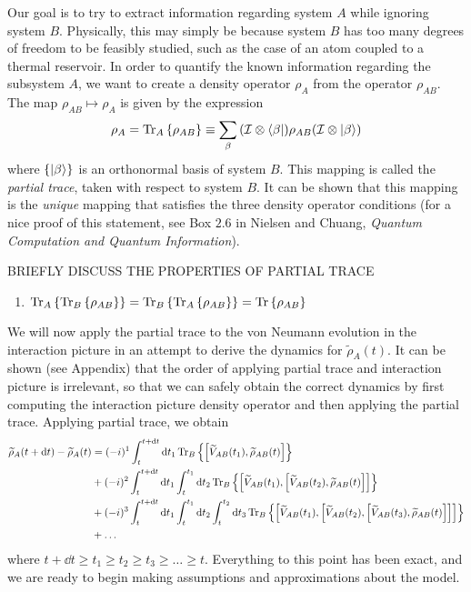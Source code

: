 \documentclass[aps, prl, preprint]{revtex4-1}
\newcommand{\ten}{\otimes}
\newcommand{\Tra}[1]{\Tr\left\{#1\right\}}
\newcommand{\Ptra}[2]{\Tr_{#1}\left\{#2\right\}}
\newcommand{\til}[1]{\widetilde{#1}}
\newcommand{\I}{\mathcal{I}}
\begin{document}
Our goal is to try to extract information regarding system $A$ while ignoring system $B$. Physically, this may simply be because system $B$ has too many degrees of freedom to be feasibly studied, such as the case of an atom coupled to a thermal reservoir. In order to quantify the known information regarding the subsystem $A$, we want to create a density operator $\rho_A$ from the operator $\rho_{AB}$. The map $\rho_{AB}\mapsto\rho_A$ is given by the expression
\begin{equation}\label{ptra}
\rho_A = \Ptra{A}{\rho_{AB}}\equiv\sum_{\beta}\qty(\I\ten\bra{\beta})\rho_{AB}\qty(\I\ten\ket{\beta})
\end{equation}
where $\{\ket{\beta}\}$ is an orthonormal basis of system $B$. This mapping is called the \textit{partial trace}, taken with respect to system $B$. It can be shown that this mapping is the \textit{unique} mapping that satisfies the three density operator conditions (for a nice proof of this statement, see Box $2.6$ in Nielsen and Chuang, \textit{Quantum Computation and Quantum Information}).

BRIEFLY DISCUSS THE PROPERTIES OF PARTIAL TRACE
\begin{enumerate}
	\item $\Ptra{A}{\Ptra{B}{\rho_{AB}}} = \Ptra{B}{\Ptra{A}{\rho_{AB}}} = \Tra{\rho_{AB}}$
\end{enumerate}

We will now apply the partial trace to the von Neumann evolution in the interaction picture in an attempt to derive the dynamics for $\til{\rho}_A(t)$. It can be shown (see Appendix) that the order of applying partial trace and interaction picture is irrelevant, so that we can safely obtain the correct dynamics by first computing the interaction picture density operator and then applying the partial trace. Applying partial trace, we obtain
\begin{align}\label{partintpert}
\begin{split}
\til{\rho}_{A}(t+\dd{t}) - \til{\rho}_{A}(t) &= (-i)^1\int_t^{t+\dd{t}}\dd{t_1}\Ptra{B}{\comm{\til{V}_{AB}(t_1)}{\til{\rho}_{AB}(t)}}\\
&+(-i)^2\int_t^{t+\dd{t}}\dd{t_1}\int_t^{t_1}\dd{t_2}\Ptra{B}{\comm{\til{V}_{AB}(t_1)}{\comm{\til{V}_{AB}(t_2)}{\til{\rho}_{AB}(t)}}}\\
&+(-i)^3\int_t^{t+\dd{t}}\dd{t_1}\int_t^{t_1}\dd{t_2}\int_t^{t_2}\dd{t_3}\Ptra{B}{\comm{\til{V}_{AB}(t_1)}{\comm{\til{V}_{AB}(t_2)}{\comm{\til{V}_{AB}(t_3)}{\til{\rho}_{AB}(t)}}}}\\
&+\ldots
\end{split}
\end{align}
where $t+\dd{t}\geq t_1\geq t_2\geq t_3\geq \ldots\geq t$. Everything to this point has been exact, and we are ready to begin making assumptions and approximations about the model.
\end{document}
